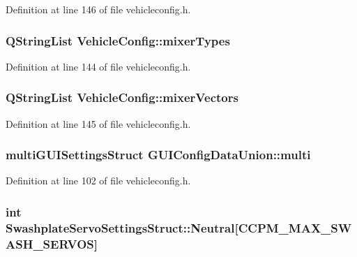 \-Definition at line 146 of file vehicleconfig.\-h.

\hypertarget{group___config_plugin_ga494123875db35fe04e5a0512850e8c02}{
\subsubsection[{mixer\-Types}]{\setlength{\rightskip}{0pt plus 5cm}\-Q\-String\-List {\bf \-Vehicle\-Config\-::mixer\-Types}}}\label{group___config_plugin_ga494123875db35fe04e5a0512850e8c02}


\-Definition at line 144 of file vehicleconfig.\-h.

\hypertarget{group___config_plugin_ga0f47a1cc91e5a63c70f0802f3533e193}{
\subsubsection[{mixer\-Vectors}]{\setlength{\rightskip}{0pt plus 5cm}\-Q\-String\-List {\bf \-Vehicle\-Config\-::mixer\-Vectors}}}\label{group___config_plugin_ga0f47a1cc91e5a63c70f0802f3533e193}


\-Definition at line 145 of file vehicleconfig.\-h.

\hypertarget{group___config_plugin_ga2bab1814b15f618e30827215faea4f5e}{
\subsubsection[{multi}]{\setlength{\rightskip}{0pt plus 5cm}multi\-G\-U\-I\-Settings\-Struct {\bf \-G\-U\-I\-Config\-Data\-Union\-::multi}}}\label{group___config_plugin_ga2bab1814b15f618e30827215faea4f5e}


\-Definition at line 102 of file vehicleconfig.\-h.

\hypertarget{group___config_plugin_gad228ac505087eafb0d00d4aab3b3e76d}{
\subsubsection[{\-Neutral}]{\setlength{\rightskip}{0pt plus 5cm}int {\bf \-Swashplate\-Servo\-Settings\-Struct\-::\-Neutral}\mbox{[}\-C\-C\-P\-M\-\_\-\-M\-A\-X\-\_\-\-S\-W\-A\-S\-H\-\_\-\-S\-E\-R\-V\-O\-S\mbox{]}}}\label{group___config_plugin_gad228ac505087eafb0d00d4aab3b3e76d}



